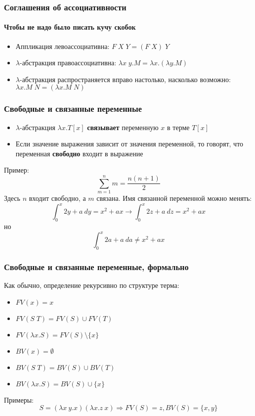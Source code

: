 \documentclass[xetex,mathserif,serif]{beamer}
\begin{document}
	\begin{frame}
		\frametitle{Соглашения об ассоциативности}
		\framesubtitle{Чтобы не надо было писать кучу скобок}
		\begin{itemize}
			\item Аппликация левоассоциативна: $F \; X \; Y = (F \; X) \; Y$
			\item $\lambda$-абстракция правоассоциативна: 
					$\lambda x \; y.M  = \lambda x.(\lambda y.M)$
			\item $\lambda$-абстракция распространяется вправо настолько, 
					насколько возможно: $\lambda x.M \; N = (\lambda x.M \; N)$
		\end{itemize}
	\end{frame}

	\begin{frame}
		\frametitle{Свободные и связанные переменные}
		\begin{itemize}
			\item $\lambda$-абстракция $\lambda x.T[x]$ \textbf{связывает} переменную $x$ в терме $T[x]$
			\item Если значение выражения зависит от значения переменной, то говорят, что
					переменная \textbf{свободно} входит в выражение
		\end{itemize}
		Пример:
		$$\sum_{m = 1}^{n} m = \frac{n(n + 1)}{2}$$
		Здесь $n$ входит свободно, а $m$ связана.
		Имя связанной переменной можно менять:
		$$\int_{0}^{x}2y + a\ dy = x^2 + ax \longrightarrow \int_{0}^{x}2z + a\ dz = x^2 + ax$$
		но
		$$\int_{0}^{x}2a + a\ da \neq x^2 + ax$$				
	\end{frame}

	\begin{frame}
		\frametitle{Свободные и связанные переменные, формально}
		Как обычно, определение рекурсивно по структуре терма:
		\begin{itemize}
			\item $FV(x) = x$
			\item $FV(S \; T) = FV(S) \cup FV(T)$
			\item $FV(\lambda x.S) = FV(S) \setminus \{x\}$
		\end{itemize}

		\begin{itemize}
			\item $BV(x) = \emptyset$
			\item $BV(S \; T) = BV(S) \cup BV(T)$
			\item $BV(\lambda x.S) = BV(S) \cup \{x\}$
		\end{itemize}
		Примеры:
		$$S = (\lambda x\ y.x) (\lambda x.z\ x) \Rightarrow FV(S) = {z}, BV(S) = \{x,y\}$$
	\end{frame}
	
\end{document}
